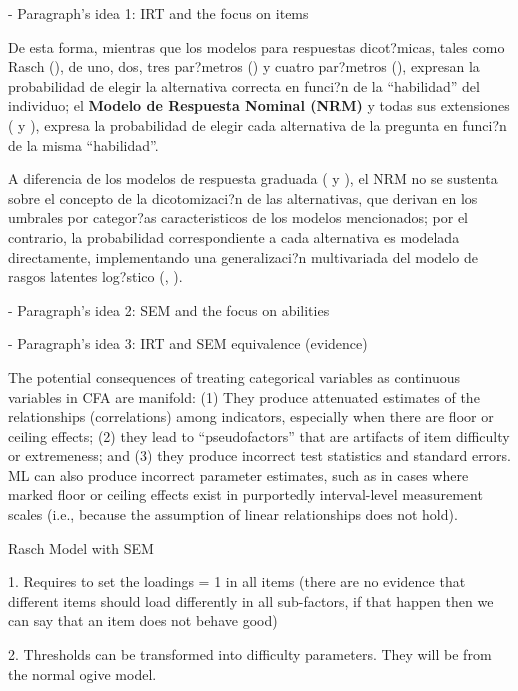 - Paragraph's idea 1: IRT and the focus on items

De esta forma, mientras que los modelos para respuestas dicot?micas, tales como Rasch (\citealp{Rasch1980}), de uno, dos, tres par?metros (\citealp{Lord_Nov2008}) y cuatro par?metros (\citealp{McDonald1967}), expresan la probabilidad de elegir la alternativa correcta en funci?n de la ``habilidad'' del individuo; el \textbf{Modelo de Respuesta Nominal (NRM)} y todas sus extensiones (\citealt{Bock1972}  y \citealt[cap?tulo 2]{Linden1997}), expresa la probabilidad de elegir cada alternativa de la pregunta en funci?n de la misma ``habilidad''.

A diferencia de los modelos de respuesta graduada (\citealt{Samejima1969, Samejima1972} y \citealt[cap?tulo 5]{Ham_Swam1991}), el NRM no se sustenta sobre el concepto de la dicotomizaci?n de las alternativas, que derivan en los umbrales por categor?as caracteristicos de los modelos mencionados; por el contrario, la probabilidad correspondiente a cada alternativa es modelada directamente, implementando una generalizaci?n multivariada del modelo de rasgos latentes log?stico (\citealt{Bock1972}, \citealt{Ostini2006}).



- Paragraph's idea 2: SEM and the focus on abilities




- Paragraph's idea 3: IRT and SEM equivalence (evidence)

\citep{Brown_2015}
The potential consequences of treating categorical variables as continuous variables in CFA are manifold: (1) They produce attenuated estimates of the relationships (correlations) among indicators, especially when there are floor or ceiling effects; (2) they lead to “pseudofactors” that are artifacts of item difficulty or extremeness; and (3) they produce incorrect test statistics and standard errors. ML can also produce  incorrect parameter estimates, such as in cases where marked floor or ceiling effects exist in purportedly interval-level measurement scales (i.e., because the assumption of linear relationships does not hold).


Rasch Model with SEM

1. Requires to set the loadings = 1 in all items 
(there are no evidence that different items should load differently in all sub-factors, if that happen then we can say that an item does not behave good)

2. Thresholds can be transformed into difficulty parameters. They will be from the normal ogive model.


